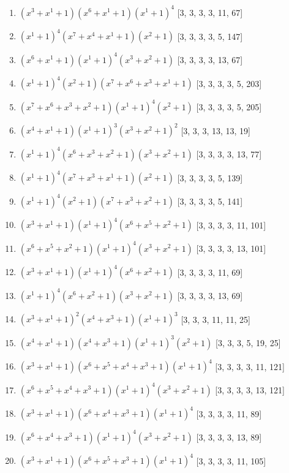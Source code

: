 \documentclass[10pt,twocolumn]{article}
\begin{document}
\begin{enumerate}
\item $(x^{3} + x^{1} + 1)(x^{6} + x^{1} + 1)(x^{1} + 1)^{4}$  [3, 3, 3, 3, 11, 67]
\item $(x^{1} + 1)^{4}(x^{7} + x^{4} + x^{1} + 1)(x^{2} + 1)$  [3, 3, 3, 3, 5, 147]
\item $(x^{6} + x^{1} + 1)(x^{1} + 1)^{4}(x^{3} + x^{2} + 1)$  [3, 3, 3, 3, 13, 67]
\item $(x^{1} + 1)^{4}(x^{2} + 1)(x^{7} + x^{6} + x^{3} + x^{1} + 1)$  [3, 3, 3, 3, 5, 203]
\item $(x^{7} + x^{6} + x^{3} + x^{2} + 1)(x^{1} + 1)^{4}(x^{2} + 1)$  [3, 3, 3, 3, 5, 205]
\item $(x^{4} + x^{1} + 1)(x^{1} + 1)^{3}(x^{3} + x^{2} + 1)^{2}$  [3, 3, 3, 13, 13, 19]
\item $(x^{1} + 1)^{4}(x^{6} + x^{3} + x^{2} + 1)(x^{3} + x^{2} + 1)$  [3, 3, 3, 3, 13, 77]
\item $(x^{1} + 1)^{4}(x^{7} + x^{3} + x^{1} + 1)(x^{2} + 1)$  [3, 3, 3, 3, 5, 139]
\item $(x^{1} + 1)^{4}(x^{2} + 1)(x^{7} + x^{3} + x^{2} + 1)$  [3, 3, 3, 3, 5, 141]
\item $(x^{3} + x^{1} + 1)(x^{1} + 1)^{4}(x^{6} + x^{5} + x^{2} + 1)$  [3, 3, 3, 3, 11, 101]
\item $(x^{6} + x^{5} + x^{2} + 1)(x^{1} + 1)^{4}(x^{3} + x^{2} + 1)$  [3, 3, 3, 3, 13, 101]
\item $(x^{3} + x^{1} + 1)(x^{1} + 1)^{4}(x^{6} + x^{2} + 1)$  [3, 3, 3, 3, 11, 69]
\item $(x^{1} + 1)^{4}(x^{6} + x^{2} + 1)(x^{3} + x^{2} + 1)$  [3, 3, 3, 3, 13, 69]
\item $(x^{3} + x^{1} + 1)^{2}(x^{4} + x^{3} + 1)(x^{1} + 1)^{3}$  [3, 3, 3, 11, 11, 25]
\item $(x^{4} + x^{1} + 1)(x^{4} + x^{3} + 1)(x^{1} + 1)^{3}(x^{2} + 1)$  [3, 3, 3, 5, 19, 25]
\item $(x^{3} + x^{1} + 1)(x^{6} + x^{5} + x^{4} + x^{3} + 1)(x^{1} + 1)^{4}$  [3, 3, 3, 3, 11, 121]
\item $(x^{6} + x^{5} + x^{4} + x^{3} + 1)(x^{1} + 1)^{4}(x^{3} + x^{2} + 1)$  [3, 3, 3, 3, 13, 121]
\item $(x^{3} + x^{1} + 1)(x^{6} + x^{4} + x^{3} + 1)(x^{1} + 1)^{4}$  [3, 3, 3, 3, 11, 89]
\item $(x^{6} + x^{4} + x^{3} + 1)(x^{1} + 1)^{4}(x^{3} + x^{2} + 1)$  [3, 3, 3, 3, 13, 89]
\item $(x^{3} + x^{1} + 1)(x^{6} + x^{5} + x^{3} + 1)(x^{1} + 1)^{4}$  [3, 3, 3, 3, 11, 105]

\end{enumerate}
\end{document}
